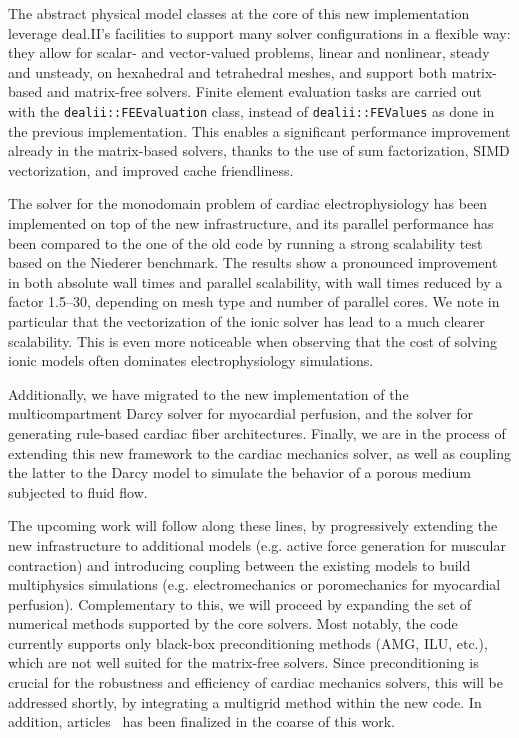 \documentclass[a4paper,12pt, numbers]{article}
\begin{document}
The abstract physical model classes at the core of this new implementation leverage deal.II's facilities to support many solver configurations in a flexible way: they allow for scalar- and vector-valued problems, linear and nonlinear, steady and unsteady, on hexahedral and tetrahedral meshes, and support both matrix-based and matrix-free solvers. Finite element evaluation tasks are carried out with the \texttt{dealii::FEEvaluation} class, instead of \texttt{dealii::FEValues} as done in the previous implementation. This enables a significant performance improvement already in the matrix-based solvers, thanks to the use of sum factorization, SIMD vectorization, and improved cache friendliness.

The solver for the monodomain problem of cardiac electrophysiology has been implemented on top of the new infrastructure, and its parallel performance has been compared to the one of the old code by running a strong scalability test based on the Niederer benchmark. The results show a pronounced improvement in both absolute wall times and parallel scalability, with wall times reduced by a factor 1.5--30, depending on mesh type and number of parallel cores. We note in particular that the vectorization of the ionic solver has lead to a much clearer scalability. This is even more noticeable when observing that the cost of solving ionic models often dominates electrophysiology simulations.

Additionally, we have migrated to the new implementation of the multicompartment Darcy solver for myocardial perfusion, and the solver for generating rule-based cardiac fiber architectures. Finally, we are in the process of extending this new framework to the cardiac mechanics solver, as well as coupling the latter to the Darcy model to simulate the behavior of a porous medium subjected to fluid flow.

The upcoming work will follow along these lines, by progressively extending the new infrastructure to additional models (e.g. active force generation for muscular contraction) and introducing coupling between the existing models to build multiphysics simulations (e.g. electromechanics or poromechanics for myocardial perfusion). Complementary to this, we will proceed by expanding the set of numerical methods supported by the core solvers. Most notably, the code currently supports only black-box preconditioning methods (AMG, ILU, etc.), which are not well suited for the matrix-free solvers. Since preconditioning is crucial for the robustness and efficiency of cardiac mechanics solvers, this will be addressed shortly, by integrating a multigrid method within the new code. In addition, articles~\cite{bucelli2025, fumagalli2025} has been finalized in the coarse of this work.
\end{document}
